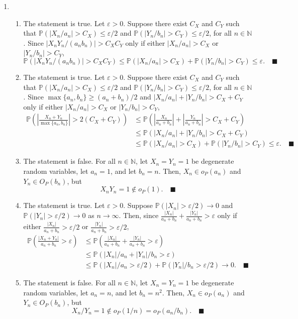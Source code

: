 \documentclass[11pt]{article}
\renewcommand{\qed}{\quad \ensuremath{\blacksquare}}
\newcommand{\pr}{\mathbb{P}} %
\newcommand{\N}{\mathbb{N}} %
\newcommand{\e}{\varepsilon} %
\begin{document}
\begin{enumerate}
\item
\begin{enumerate}
\item The statement is true. Let $\e > 0$. Suppose there exist $C_X$ and $C_Y$
such that $\pr(|X_n/a_n| > C_X) \leq \e/2$ and
$\pr(|Y_n/b_n| > C_Y) \leq \e/2$, for all $n \in \N$. Since
$|X_nY_n/(a_nb_n)| > C_XC_Y$ only if either $|X_n/a_n| > C_X$ or
$|Y_n/b_n| > C_Y$,
\[\pr(|X_nY_n/(a_nb_n)| > C_XC_Y)
    \leq \pr(|X_n/a_n| > C_X) + \pr(|Y_n/b_n| > C_Y)
    \leq \e. \qed
\]

\item The statement is true. Let $\e > 0$. Suppose there exist $C_X$ and $C_Y$
such that $\pr(|X_n/a_n| > C_X) \leq \e/2$ and
$\pr(|Y_n/b_n| > C_Y) \leq \e/2$, for all $n \in \N$. Since
$\max\{a_n,b_n\} \geq (a_n + b_n)/2$ and $|X_n/a_n| + |Y_n/b_n| > C_X + C_Y$
only if either $|X_n/a_n| > C_X$ or $|Y_n/b_n| > C_Y$,
\begin{align*}
\pr\left(\left| \frac{X_n + Y_n}{\max\{a_n,b_n\}} \right| > 2(C_X + C_Y) \right)
 &  \leq \pr\left(\left|\frac{X_n}{a_n + b_n}\right|
                + \left| \frac{Y_n}{a_n + b_n} \right| > C_X + C_Y \right)  \\
 &  \leq \pr(|X_n/a_n| + |Y_n/b_n| > C_X + C_Y) \\
 &  \leq \pr(|X_n/a_n| > C_X) + \pr(|Y_n/b_n| > C_Y)
    \leq \e. \qed
\end{align*}

\item The statement is false. For all $n \in \N$, let $X_n = Y_n = 1$ be
degenerate random variables, let $a_n = 1$, and let $b_n = n$. Then, 
$X_n \in o_P(a_n)$ and $Y_n \in O_P(b_n)$, but
\[X_nY_n = 1 \notin o_P(1). \qed\]

\item The statement is true. Let $\e > 0$. Suppose $\pr(|X_n| > \e/2) \to 0$
and $\pr(|Y_n| > \e/2) \to 0$ as $n \to \infty$. Then, since
$\frac{|X_n|}{a_n + b_n} + \frac{|Y_n|}{a_n + b_n} > \e$ only if either
$\frac{|X_n|}{a_n + b_n} > \e/2$ or $\frac{|Y_n|}{a_n + b_n} > \e/2$,
\begin{align*}
\pr\left( \frac{|X_n + Y_n|}{a_n + b_n} > \e \right)
 &  \leq \pr\left( \frac{|X_n|}{a_n + b_n}
                    + \frac{|Y_n|}{a_n + b_n} > \e \right) \\
 &  \leq \pr\left( |X_n|/a_n + |Y_n|/b_n > \e \right) \\
 &  \leq \pr\left( |X_n|/a_n > \e/2 \right)
    + \pr\left( |Y_n|/b_n > \e/2 \right)
    \to 0. \qed
\end{align*}

\item The statement is false. For all $n \in \N$, let $X_n = Y_n = 1$ be
degenerate random variables, let $a_n = n$, and let $b_n = n^2$. Then,
$X_n \in o_P(a_n)$ and $Y_n \in O_P(b_n)$, but
\[X_n/Y_n = 1 \notin o_P(1/n) = o_P(a_n/b_n). \qed\]

\end{enumerate}
 
\end{enumerate}
\end{document}
